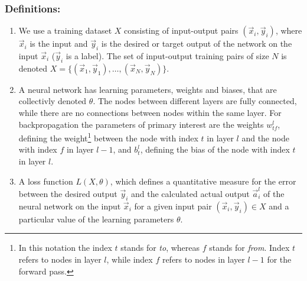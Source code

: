 \subsubsection*{Definitions:}
\begin{enumerate}
    \item We use a training dataset $X$ consisting of input-output pairs $(\vec{x}_i,
    \vec{y}_i)$, where $\vec{x}_i$ is the input and $\vec{y}_i$ is the desired or target
    output of the network on the input $\vec{x}_i$ ($\vec{y}_i$ is a label). The set of
    input-output training pairs of size $N$ is denoted $X = \{(\vec{x}_1,\vec{y}_1),
    \dots, (\vec{x}_N,\vec{y}_N)\}$.

    \item A neural network has learning parameters, weights and biases, that are
    collectivly denoted $\theta$. The nodes between different layers are fully connected,
    while there are no connections between nodes within the same layer. For
    backpropagation the parameters of primary interest are the weights $w^l_{tf}$,
    defining the weight\footnote{In this notation the index $t$ stands for \emph{to},
    whereas $f$ stands for \emph{from}. Index $t$ refers to nodes in layer $l$, while
    index $f$ refers to nodes in layer $l-1$ for the forward pass.} between the node with
    index $t$ in layer $l$ and the node with index $f$ in layer $l-1$, and $b^l_t$,
    defining the bias of the node with index $t$ in layer $l$. 

    \item A loss function $L(X,\theta)$, which defines a quantitative measure for the
    error between the desired output $\vec{y}_i$ and the calculated actual output
    $\vec{a}^l_i$ of the neural network on the input $\vec{x}_i$ for a given input pair
    $(\vec{x}_i, \vec{y}_i) \in X$ and a particular value of the learning parameters
    $\theta$.
\end{enumerate}

